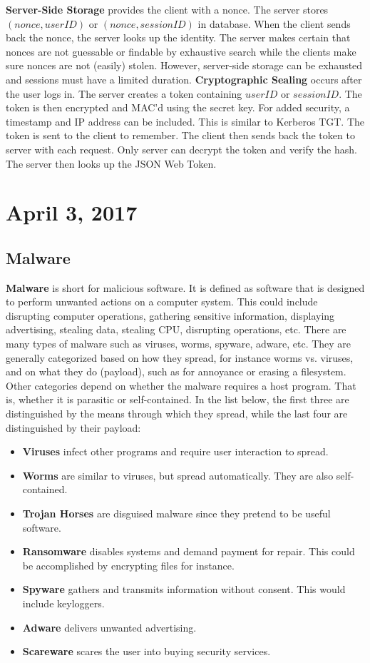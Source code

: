 \documentclass[11pt]{article}
\theoremstyle{plain} %
\theoremstyle{definition}
\theoremstyle{example}
\theoremstyle{remark}
\begin{document}
\textbf{Server-Side Storage} provides the client with a nonce. The server stores $(nonce,userID)$ or $(nonce,sessionID)$ in database. When the client sends back the nonce, the server looks up the identity. The server makes certain that nonces are not guessable or findable by exhaustive search while the clients make sure nonces are not (easily) stolen. However, server-side storage can be exhausted and sessions must have a limited duration. \textbf{Cryptographic Sealing} occurs after the user logs in. The server creates a token containing $userID$ or $sessionID$. The token is then encrypted and MAC'd using the secret key. For added security, a timestamp and IP address can be included. This is similar to Kerberos TGT. The token is sent to the client to remember. The client then sends back the token to server with each request. Only server can decrypt the token and verify the hash. 
The server then looks up the JSON Web Token.



\section{April 3, 2017}
\subsection{Malware}

\textbf{Malware} is short for malicious software. It is defined as software that is designed to perform unwanted actions on a computer system. This could include disrupting computer operations, gathering sensitive information, displaying advertising, stealing data, stealing CPU, disrupting operations, etc. There are many types of malware such as viruses, worms, spyware, adware, etc. They are generally categorized based on how they spread, for instance worms vs. viruses, and on what they do (payload), such as for annoyance or erasing a filesystem. Other categories depend on whether the malware requires a host program. That is, whether it is parasitic or self-contained. In the list below, the first three are distinguished by the means through which they spread, while the last four are distinguished by their payload:
\begin{itemize}
	\item \textbf{Viruses} infect other programs and require user interaction to spread.
	\item \textbf{Worms} are similar to viruses, but spread automatically. They are also self-contained. 
	\item \textbf{Trojan Horses} are disguised malware since they pretend to be useful software. 
	\item \textbf{Ransomware} disables systems and demand payment for repair. This could be accomplished by encrypting files for instance. 
	\item \textbf{Spyware} gathers and transmits information without consent. This would include keyloggers. 
	\item \textbf{Adware} delivers unwanted advertising.
	\item \textbf{Scareware} scares the user into buying security services. 
\end{itemize}
\end{document}
